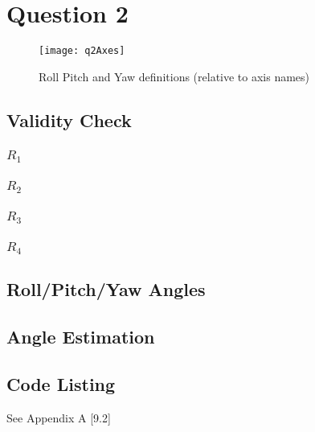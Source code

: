 \section{Question 2}
	

	\begin{figure}[position = here]
		\begin{centering}
		\texttt{[image: q2Axes]}
		\caption[\textit{RPYAxes}]{Roll Pitch and Yaw definitions (relative to axis names)}
		\end{centering}
	\end{figure}
	
	\subsection{Validity Check}
		\subsubsection{$R_{1}$}
	
			
		\pagebreak
		\subsubsection{$R_{2}$}
			
		\subsubsection{$R_{3}$}
		
		\subsubsection{$R_{4}$}
			
						
	\newpage
	\subsection{Roll/Pitch/Yaw Angles}

	\subsection{Angle Estimation}
	
	\subsection*{Code Listing}
	See Appendix A [9.2]